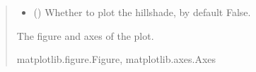 \documentclass[letterpaper,10pt,english]{sphinxmanual}
\begin{document}
\begin{fulllineitems}
\begin{quote}
\begin{description}
\begin{itemize}
\item {} 
\sphinxAtStartPar
{} (\sphinxstyleliteralemphasis{\sphinxupquote{, }}) \textendash{} Whether to plot the hillshade, by default False.

\end{itemize}

\sphinxAtStartPar
{} \textendash{} The figure and axes of the plot.

\sphinxAtStartPar
matplotlib.figure.Figure, matplotlib.axes.Axes

\end{description}\end{quote}

\end{fulllineitems}

\end{document}
